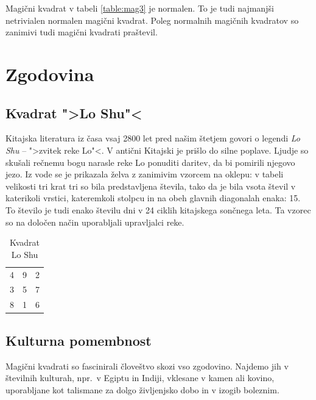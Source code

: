 \documentclass[a4paper,12pt]{article}
\newenvironment{magic}[3]
{
  \begin{table}[!ht]
  \centering
  \caption{#2}    
  \label{#3}      
  \begin{tabular}{|*{3}{c|}}
  \hline
}
{
  \hline
  \end{tabular}
  \end{table}
}
\theoremstyle{definition}
\theoremstyle{plain}
\begin{document}
Magični kvadrat v tabeli \ref{table:mag3} je normalen.
To je tudi najmanjši netrivialen normalen magični kvadrat.
Poleg normalnih magičnih kvadratov so zanimivi tudi magični kvadrati praštevil.


\section{Zgodovina}

\subsection{Kvadrat ">Lo Shu"<}

Kitajska literatura iz časa vsaj 2800 let pred našim štetjem govori o legendi
\emph{Lo Shu} -- ">zvitek reke Lo"<. V antični Kitajski je prišlo do
silne poplave. Ljudje so skušali rečnemu bogu narasle reke Lo ponuditi daritev,
da bi pomirili njegovo jezo. Iz vode se je prikazala želva z zanimivim vzorcem
na oklepu: v tabeli velikosti tri krat tri so bila predstavljena števila, tako
da je bila vsota števil v katerikoli vrstici, kateremkoli stolpcu in na obeh
glavnih diagonalah enaka: 15. To število je tudi enako številu dni v 24 ciklih
kitajskega sončnega leta. Ta vzorec so na določen način uporabljali upravljalci
reke.


\begin{magic}{3}{Kvadrat Lo Shu}{table:loshu}
4 & 9 & 2 \\
3 & 5 & 7 \\
8 & 1 & 6 \\
\end{magic}

\subsection{Kulturna pomembnost}

Magični kvadrati so fascinirali človeštvo skozi vso zgodovino. Najdemo jih
v številnih kulturah, npr.\ v Egiptu in Indiji, vklesane v kamen ali
kovino, uporabljane kot talismane za dolgo življenjsko dobo in v
izogib boleznim.
\end{document}
